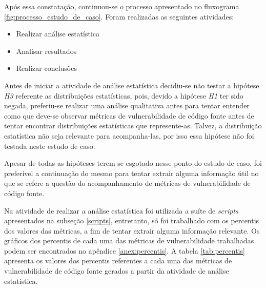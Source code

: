 Após essa constatação, continuou-se o processo apresentado no fluxograma 
\ref{fig:processo_estudo_de_caso}. Foram realizadas as seguintes atividades:

\begin{itemize}
  \item Realizar análise estatística
  \item Analisar resultados
  \item Realizar conclusões
\end{itemize}

Antes de iniciar a atividade de análise estatística decidiu-se não testar a
hipótese \emph{H3} referente as distribuições estatísticas, pois, devido a
hipótese \emph{H1} ter sido negada, preferiu-se realizar uma análise qualitativa
antes para tentar entender como que deve-se observar métricas de vulnerabilidade de código
fonte antes de tentar encontrar distribuições estatísticas que represente-as.
Talvez, a distribuição estatística não seja relevante para acompanha-las, por
isso essa hipótese não foi testada neste estudo de caso.

Apesar de todas as hipóteses terem se esgotado nesse ponto do estudo de caso,
foi preferível a continuação do mesmo para tentar extrair alguma informação
útil no que se refere a questão do acompanhamento de métricas de vulnerabilidade de código
fonte.

Na atividade de realizar a análise estatística foi utilizada a suíte de
\textit{scripts} apresentados na subseção \ref{scripts}, entretanto, só foi
trabalhado com os percentis dos valores das métricas, a fim de tentar extrair
alguma informação relevante. Os gráficos dos percentis de cada uma das métricas 
de vulnerabilidade trabalhadas podem ser encontrados no apêndice \ref{anex:percentis}. 
A tabela \ref{tab:percentis} apresenta os valores dos percentis referentes a cada
uma das métricas de vulnerabilidade de código fonte gerados a partir da atividade
de análise estatística.

